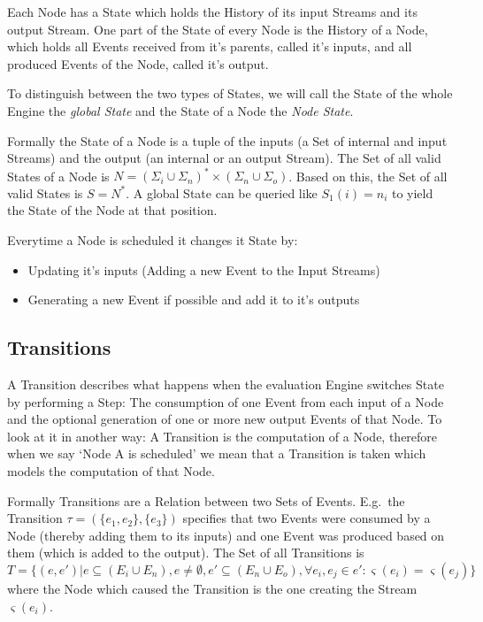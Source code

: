 Each Node has a State which holds the History of its input Streams and its output Stream.
One part of the State of every Node is the History of a Node, which holds all Events received from it's parents, called it's inputs, and all produced Events of the Node, called it's output.

To distinguish between the two types of States, we will call the State of the whole Engine the \emph{global State} and the State of a Node the \emph{Node State}.

Formally the State of a Node is a tuple of the inputs (a Set of internal and input Streams) and the output (an internal or an output Stream).
The Set of all valid States of a Node is \(N = {(\Sigma_i \cup \Sigma_n)}^*\times(\Sigma_n \cup \Sigma_o)\).
Based on this, the Set of all valid States is \(S = N^*\).
A global State can be queried like \(S_1(i) = n_i\) to yield the State of the Node at that position.

Everytime a Node is scheduled it changes it State by:

\begin{itemize}
  \item Updating it's inputs (Adding a new Event to the Input Streams)
  \item Generating a new Event if possible and add it to it's outputs
\end{itemize}

\subsection{Transitions}
\label{sec:concepts:def:transitions}

A Transition describes what happens when the evaluation Engine switches State by performing a Step:
The consumption of one Event from each input of a Node and the optional generation of one or more new output Events of that Node.
To look at it in another way: A Transition is the computation of a Node, therefore when we say `Node A is scheduled' we mean that a Transition is taken which models the computation of that Node.

Formally Transitions are a Relation between two Sets of Events.
E.g.\ the Transition \(\tau = (\{e_1,e_2\}, \{e_3\})\) specifies that two Events were consumed by a Node (thereby adding them to its inputs) and one Event was produced based on them (which is added to the output).
The Set of all Transitions is
\[
  T = \{(e, e') | e \subseteq (E_i \cup E_n),e \neq \emptyset, e' \subseteq (E_n \cup E_o), \forall e_i, e_j \in e': \varsigma(e_i) = \varsigma(e_j)\}
\]
where the Node which caused the Transition is the one creating the Stream \(\varsigma(e_i)\).

